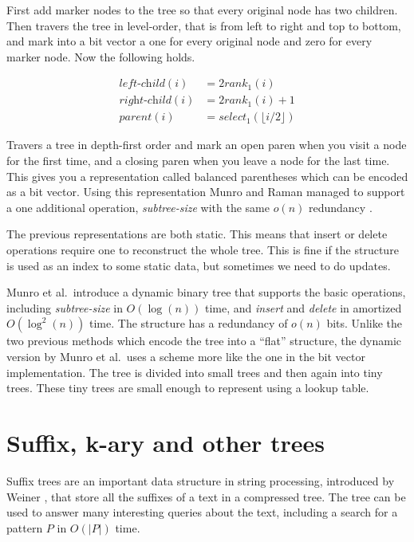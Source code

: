 \documentclass[11pt]{article}
\newcommand{\bigo}{O}
\newcommand{\smallo}{o}
\newcommand{\rank}{\textit{rank}}
\newcommand{\select}{\textit{select}}
\begin{document}
First add marker nodes to the tree so that every original node has two
children. Then travers the tree in level-order, that is from left to
right and top to bottom, and mark into a bit vector a one for every
original node and zero for every marker node. Now the following holds.

\begin{align*}
  \textit{left-child}(i) &= 2\rank_1(i) \\
  \textit{right-child}(i) &= 2\rank_1(i) + 1 \\
  \textit{parent}(i) &= \select_1(\lfloor i / 2 \rfloor )
\end{align*}

Travers a tree in depth-first order and mark an open paren when you
visit a node for the first time, and a closing paren when you leave a
node for the last time. This gives you a representation called
balanced parentheses which can be encoded as a bit vector. Using this
representation Munro and Raman managed to support a one additional
operation, \textit{subtree-size} with the same $\smallo(n)$ redundancy
\cite{munro01a}.

The previous representations are both static. This means that insert
or delete operations require one to reconstruct the whole tree. This
is fine if the structure is used as an index to some static data, but
sometimes we need to do updates.

Munro et al.\ introduce \cite{munro01b} a dynamic binary tree that
supports the basic operations, including \textit{subtree-size} in
$\bigo(\log(n))$ time, and \textit{insert} and \textit{delete} in
amortized $\bigo(\log^2(n))$ time. The structure has a redundancy of
$\smallo(n)$ bits. Unlike the two previous methods which encode the
tree into a ``flat'' structure, the dynamic version by Munro et al.\
uses a scheme more like the one in the bit vector implementation. The
tree is divided into small trees and then again into tiny trees. These
tiny trees are small enough to represent using a lookup table.

\section{Suffix, k-ary and other trees}

Suffix trees are an important data structure in string processing,
introduced by Weiner \cite{weiner73}, that store all the suffixes of a
text in a compressed tree. The tree can be used to answer many
interesting queries about the text, including a search for a pattern
$P$ in $\bigo(|P|)$ time.
\end{document}
